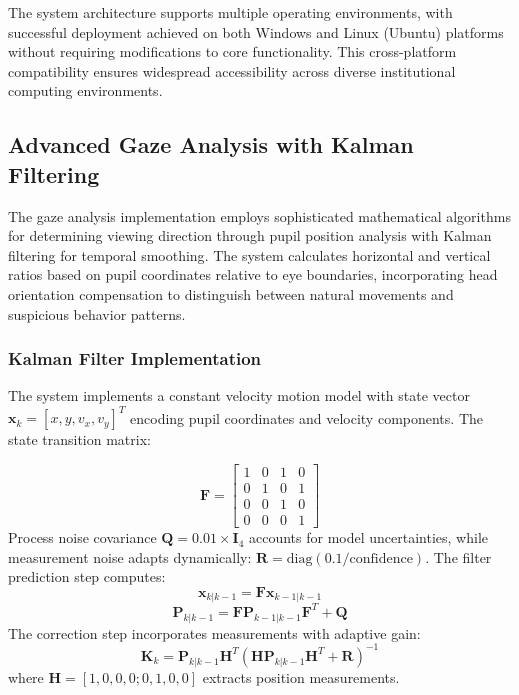 \documentclass[conference]{IEEEtran}
\begin{document}
The system architecture supports multiple operating environments, with successful 
deployment achieved on both Windows and Linux (Ubuntu) platforms without requiring 
modifications to core functionality. This cross-platform compatibility ensures 
widespread accessibility across diverse institutional computing environments.

\subsection{Advanced Gaze Analysis with Kalman Filtering}

The gaze analysis implementation employs sophisticated mathematical algorithms for determining viewing direction through pupil position analysis with Kalman filtering for temporal smoothing\cite{kalman1960new}. The system calculates horizontal and vertical ratios based on pupil coordinates relative to eye boundaries, incorporating head orientation compensation to distinguish between natural movements and suspicious behavior patterns\cite{bar2001estimation}.

\subsubsection{Kalman Filter Implementation}

The system implements a constant velocity motion model with state vector $\mathbf{x}_k = [x, y, v_x, v_y]^T$ encoding pupil coordinates and velocity components. The state transition matrix:

\begin{equation}
\mathbf{F} = \begin{bmatrix}
1 & 0 & 1 & 0 \\
0 & 1 & 0 & 1 \\
0 & 0 & 1 & 0 \\
0 & 0 & 0 & 1
\end{bmatrix}
\end{equation}
Process noise covariance $\mathbf{Q} = 0.01 \times \mathbf{I}_4$ accounts for model uncertainties, while measurement noise adapts dynamically: $\mathbf{R} = \text{diag}(0.1/\text{confidence})$. The filter prediction step computes:
\begin{equation}
\mathbf{x}_{k|k-1} = \mathbf{F}\mathbf{x}_{k-1|k-1}
\end{equation}
\begin{equation}
\mathbf{P}_{k|k-1} = \mathbf{F}\mathbf{P}_{k-1|k-1}\mathbf{F}^T + \mathbf{Q}
\end{equation}
The correction step incorporates measurements with adaptive gain:
\begin{equation}
\mathbf{K}_k = \mathbf{P}_{k|k-1}\mathbf{H}^T(\mathbf{H}\mathbf{P}_{k|k-1}\mathbf{H}^T + \mathbf{R})^{-1}
\end{equation}
where $\mathbf{H} = [1, 0, 0, 0; 0, 1, 0, 0]$ extracts position measurements.
\end{document}
